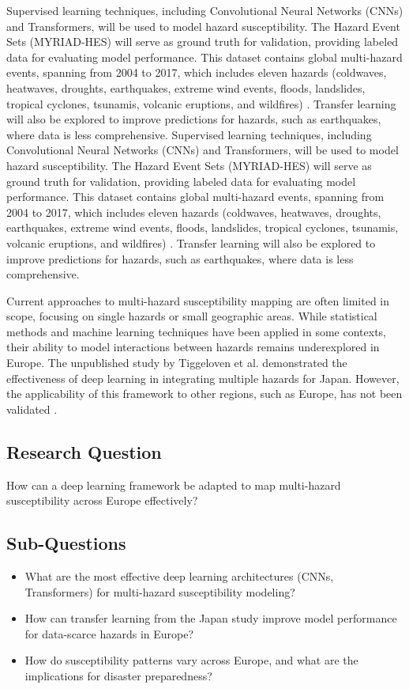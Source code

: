 Supervised learning techniques, including Convolutional Neural Networks (CNNs) and Transformers, will be used to model hazard susceptibility. The Hazard Event Sets (MYRIAD-HES) will serve as ground truth for validation, providing labeled data for evaluating model performance. This dataset contains global multi-hazard events, spanning from 2004 to 2017, which includes eleven hazards (coldwaves, heatwaves, droughts, earthquakes, extreme wind events, floods, landslides, tropical cyclones, tsunamis, volcanic eruptions, and wildfires) \cite{claassen_2023_myriad}. Transfer learning will also be explored to improve predictions for hazards, such as earthquakes, where data is less comprehensive.
Supervised learning techniques, including Convolutional Neural Networks (CNNs) and Transformers, will be used to model hazard susceptibility. The Hazard Event Sets (MYRIAD-HES) will serve as ground truth for validation, providing labeled data for evaluating model performance. This dataset contains global multi-hazard events, spanning from 2004 to 2017, which includes eleven hazards (coldwaves, heatwaves, droughts, earthquakes, extreme wind events, floods, landslides, tropical cyclones, tsunamis, volcanic eruptions, and wildfires) \cite{claassen_2023_myriad}. Transfer learning will also be explored to improve predictions for hazards, such as earthquakes, where data is less comprehensive.


Current approaches to multi-hazard susceptibility mapping are often limited in scope, focusing on single hazards or small geographic areas. \cite{Pourghasemi} While statistical methods and machine learning techniques have been applied in some contexts, their ability to model interactions between hazards remains underexplored in Europe. The unpublished study by Tiggeloven et al. demonstrated the effectiveness of deep learning in integrating multiple hazards for Japan. However, the applicability of this framework to other regions, such as Europe, has not been validated \cite{SAKICTROGRLIC2024103774}.

\subsection{Research Question}
How can a deep learning framework be adapted to map multi-hazard susceptibility across Europe effectively?

\subsection{Sub-Questions}
\begin{itemize}
    \item What are the most effective deep learning architectures (CNNs, Transformers) for multi-hazard susceptibility modeling?
	\item How can transfer learning from the Japan study improve model performance for data-scarce hazards in Europe?
	\item How do susceptibility patterns vary across Europe, and what are the implications for disaster preparedness?
\end{itemize}